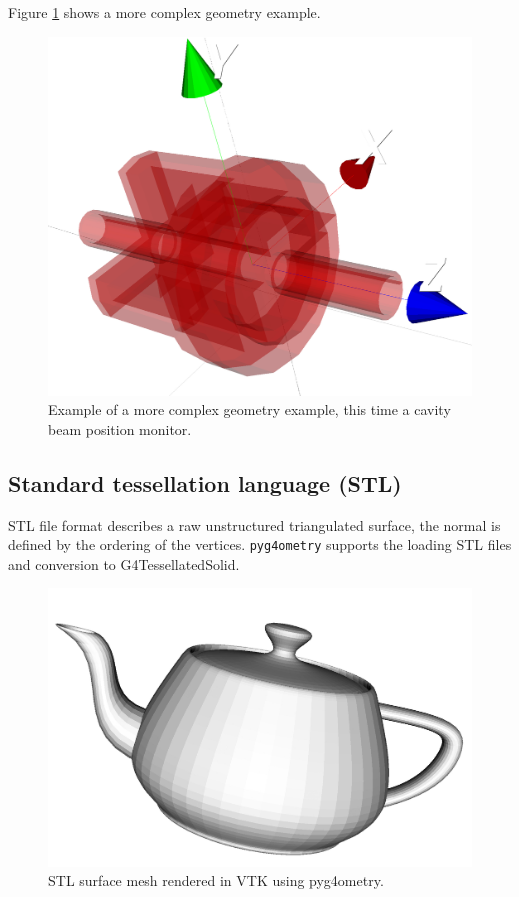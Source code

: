 \documentclass[a4paper,
               keeplastbox,   %
               ]{jacow}
\begin{document}
Figure \ref{fig:dipole} shows a more complex geometry example. 
\begin{figure}[!htb]
   \centering
   \includegraphics*[width=.9\columnwidth]{./examples/dipole.jpg}
   \caption{Example of a more complex geometry example, this time a cavity beam position monitor.}
   \label{fig:dipole}
\end{figure}

%

\subsection{Standard tessellation language (STL)}
STL file format describes a raw unstructured triangulated surface, the normal is defined by the ordering of the vertices. \verb|pyg4ometry| supports the loading 
STL files and conversion to G4TessellatedSolid. 

\begin{figure}[!htb]
   \centering
   \includegraphics*[width=.9\columnwidth]{./examples/utahteapot.jpg}
   \caption{STL surface mesh rendered in VTK using pyg4ometry.}
   \label{fig:simple}
\end{figure}
\end{document}
